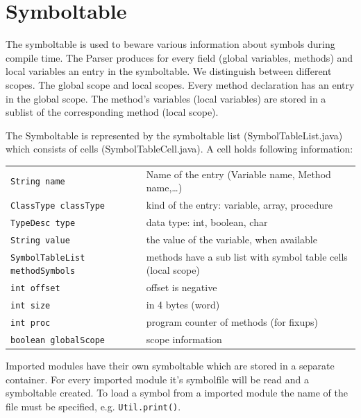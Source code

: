 \section{Symboltable}
\label{labelSymboltable}

The symboltable is used to beware various information about symbols during compile time.
The Parser produces for every field (global variables, methods) and local variables an entry in the symboltable.
We distinguish between different scopes. The global scope and local scopes. Every
method declaration has an entry in the global scope. The method's variables (local variables) are stored in a sublist of the corresponding
method (local scope).

The Symboltable is represented by the symboltable list (SymbolTableList.java) which consists of cells (SymbolTableCell.java).
A cell holds following information:
\newline
\newline
\begin{tabular}{lp{6cm}}
\texttt{String name} & Name of the entry (Variable name, Method name,\ldots) \\
\texttt{ClassType classType} & kind of the entry: variable, array, procedure \\
\texttt{TypeDesc type} & data type: int, boolean, char \\
\texttt{String value} & the value of the variable, when available \\
\texttt{SymbolTableList methodSymbols} & methods have a sub list with symbol table cells (local scope)\\
\texttt{int offset} & offset is negative \\
\texttt{int size} & in 4 bytes (word) \\
\texttt{int proc} & program counter of methods (for fixups) \\
\texttt{boolean globalScope} & scope information \\
\end{tabular}

Imported modules have their own symboltable which are stored in a separate container. For every imported module it's symbolfile 
will be read and a symboltable created.
 To load a symbol from a imported module the name of the file must be specified, e.g. \texttt{Util.print()}.







